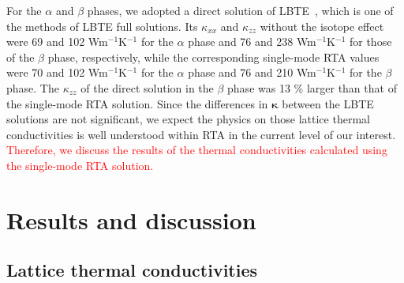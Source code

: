 \documentclass[twocolumn,amsmath,amssymb,a4paper,prb,superscriptaddress,floatfix]{revtex4-1}
\begin{document}
For the $\alpha$ and $\beta$ phases, we adopted a direct solution of
LBTE~\cite{chaput-direct}, which is one of the methods of LBTE full solutions.
Its $\kappa_{xx}$ and $\kappa_{zz}$ without the isotope effect were 69 and 102
Wm$^{-1}$K$^{-1}$ for  the $\alpha$ phase and 76 and 238 Wm$^{-1}$K$^{-1}$ for
those of the $\beta$ phase, respectively, while the corresponding single-mode
RTA values were 70 and 102 Wm$^{-1}$K$^{-1}$ for the $\alpha$ phase and 76 and
210 Wm$^{-1}$K$^{-1}$ for the $\beta$ phase. The $\kappa_{zz}$ of the direct
solution in the $\beta$ phase was 13 \% larger than that of the single-mode RTA
solution. Since the differences in $\boldsymbol{\kappa}$ between the LBTE
solutions are not significant, we expect the physics on those lattice thermal
conductivities is well understood within RTA in the current level of our
interest.  \textcolor {red} {Therefore, we discuss the results of  
the thermal conductivities calculated using the single-mode RTA solution.}

\section{Results and discussion}

\subsection{Lattice thermal conductivities}
\end{document}
